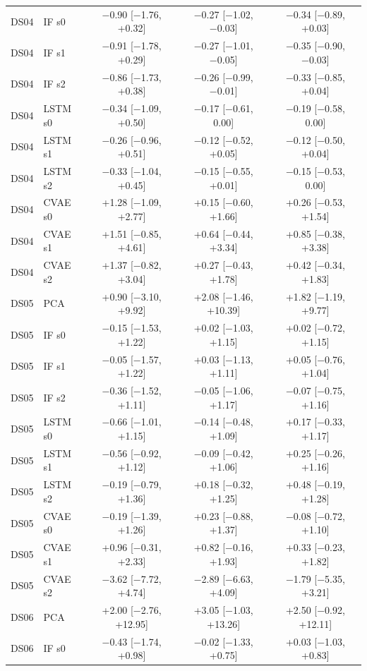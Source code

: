 \documentclass[10pt]{article}
\begin{document}
{\begin{longtable}{llccc}
DS04 & IF s0 & −0.90 [−1.76, +0.32] & −0.27 [−1.02, −0.03] & −0.34 [−0.89, +0.03] \\
DS04 & IF s1 & −0.91 [−1.78, +0.29] & −0.27 [−1.01, −0.05] & −0.35 [−0.90, −0.03] \\
DS04 & IF s2 & −0.86 [−1.73, +0.38] & −0.26 [−0.99, −0.01] & −0.33 [−0.85, +0.04] \\
DS04 & LSTM s0 & −0.34 [−1.09, +0.50] & −0.17 [−0.61, 0.00] & −0.19 [−0.58, 0.00] \\
DS04 & LSTM s1 & −0.26 [−0.96, +0.51] & −0.12 [−0.52, +0.05] & −0.12 [−0.50, +0.04] \\
DS04 & LSTM s2 & −0.33 [−1.04, +0.45] & −0.15 [−0.55, +0.01] & −0.15 [−0.53, 0.00] \\
DS04 & CVAE s0 & +1.28 [−1.09, +2.77] & +0.15 [−0.60, +1.66] & +0.26 [−0.53, +1.54] \\
DS04 & CVAE s1 & +1.51 [−0.85, +4.61] & +0.64 [−0.44, +3.34] & +0.85 [−0.38, +3.38] \\
DS04 & CVAE s2 & +1.37 [−0.82, +3.04] & +0.27 [−0.43, +1.78] & +0.42 [−0.34, +1.83] \\
\midrule
DS05 & PCA & +0.90 [−3.10, +9.92] & +2.08 [−1.46, +10.39] & +1.82 [−1.19, +9.77] \\
DS05 & IF s0 & −0.15 [−1.53, +1.22] & +0.02 [−1.03, +1.15] & +0.02 [−0.72, +1.15] \\
DS05 & IF s1 & −0.05 [−1.57, +1.22] & +0.03 [−1.13, +1.11] & +0.05 [−0.76, +1.04] \\
DS05 & IF s2 & −0.36 [−1.52, +1.11] & −0.05 [−1.06, +1.17] & −0.07 [−0.75, +1.16] \\
DS05 & LSTM s0 & −0.66 [−1.01, +1.15] & −0.14 [−0.48, +1.09] & +0.17 [−0.33, +1.17] \\
DS05 & LSTM s1 & −0.56 [−0.92, +1.12] & −0.09 [−0.42, +1.06] & +0.25 [−0.26, +1.16] \\
DS05 & LSTM s2 & −0.19 [−0.79, +1.36] & +0.18 [−0.32, +1.25] & +0.48 [−0.19, +1.28] \\
DS05 & CVAE s0 & −0.19 [−1.39, +1.26] & +0.23 [−0.88, +1.37] & −0.08 [−0.72, +1.10] \\
DS05 & CVAE s1 & +0.96 [−0.31, +2.33] & +0.82 [−0.16, +1.93] & +0.33 [−0.23, +1.82] \\
DS05 & CVAE s2 & −3.62 [−7.72, +4.74] & −2.89 [−6.63, +4.09] & −1.79 [−5.35, +3.21] \\
\midrule
DS06 & PCA & +2.00 [−2.76, +12.95] & +3.05 [−1.03, +13.26] & +2.50 [−0.92, +12.11] \\
DS06 & IF s0 & −0.43 [−1.74, +0.98] & −0.02 [−1.33, +0.75] & +0.03 [−1.03, +0.83] \\

\end{longtable}}
\end{document}

